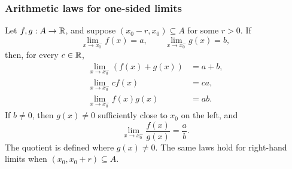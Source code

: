 \documentclass[11pt,a4paper]{amsart}
\begin{document}
\subsubsection{Arithmetic laws for one-sided limits}

\begin{theorem}\label{thm:one-sided-limit-laws}
  Let \(f,g:A\to\mathbb{R}\), and suppose \((x_0-r,x_0)\subseteq A\)
  for some \(r>0\). If
  \[
    \lim_{x\to x_0^-}f(x)=a,\qquad
    \lim_{x\to x_0^-}g(x)=b,
  \]
  then, for every \(c\in\mathbb{R}\),
  \begin{align*}
    \lim_{x\to x_0^-}(f(x)+g(x))&=a+b,\\
    \lim_{x\to x_0^-}cf(x)&=ca,\\
    \lim_{x\to x_0^-}f(x)g(x)&=ab.
  \end{align*}
  If \(b\neq0\), then \(g(x)\neq0\) sufficiently close to \(x_0\)
  on the left, and
  \[
    \lim_{x\to x_0^-}\frac{f(x)}{g(x)}=\frac ab.
  \]
  The quotient is defined where \(g(x)\neq0\). The same laws hold
  for right-hand limits when \((x_0,x_0+r)\subseteq A\).
\end{theorem}
\end{document}
